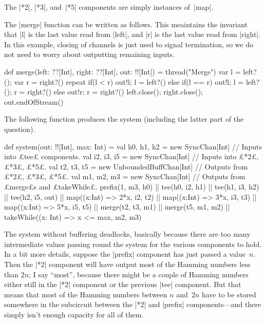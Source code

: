
\begin{answerI}
The |*2|, |*3|, and~|*5| components are simply instances of~|map|.

The |merge| function can be written as follows.  This meaintains the invariant
that  |l| is the last value read from |left|, and |r| is the last value read
from |right|.  In this example, closing of channels is just used to signal
termination, so we do not need to worry about outputting remaining inputs.
%
\begin{scala}
  def merge(left: ??[Int], right: ??[Int], out: !![Int]) = thread("Merge"){
    var l = left?(); var r = right?()
    repeat{
      if(l < r){ out!l; l = left?() }
      else if(l == r){ out!l; l = left?(); r = right?() }
      else{ out!r; r = right?() }
    }
    left.close(); right.close(); out.endOfStream()
  }
\end{scala}

The following function produces the system (including the latter part of the
question).
%
\begin{scala}
def system(out: !![Int], max: Int) = {
  val h0, h1, h2 = new SyncChan[Int]     // Inputs into £tee£ components.
  val i2, i3, i5 = new SyncChan[Int]     // Inputs into £*2£, £*3£, £*5£.
  val t2, t3, t5 = new UnboundedBuffChan[Int] // Outputs from £*2£, £*3£, £*5£.
  val m1, m2, m3 = new SyncChan[Int]    // Outputs from £merge£s and £takeWhile£.
  prefix(1, m3, h0) || tee(h0, i2, h1) || tee(h1, i3, h2) || tee(h2, i5, out) ||
  map((x:Int) => 2*x, i2, t2) || map((x:Int) => 3*x, i3, t3) || 
  map((x:Int) => 5*x, i5, t5) ||  
  merge(t2, t3, m1) || merge(t5, m1, m2) || 
  takeWhile((x: Int) => x <= max, m2, m3)
}
\end{scala}

The system without buffering deadlocks, basically because there are too many
intermediate values passing round the system for the various components to
hold.  In a bit more details, suppose the |prefix| component has just passed
a value~$n$.  Then the |*2| component will have output most of the Hamming
numbers less than $2n$; I say ``most'', because there might be a couple of
Hamming numbers either still in the |*2| component or the previous |tee|
component.  But that means that most of the Hamming numbers between $n$
and~$2n$ have to be stored somewhere in the subcircuit between the |*2| and
|prefix| components---and there simply isn't enough capacity for all of them. 
 

\end{answerI}
